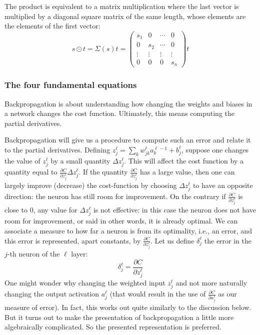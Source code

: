 \documentclass[12pt, letterpaper]{article}
\theoremstyle{definition}
\begin{document}
The product is equivalent to a matrix multiplication where the last vector is multiplied by a diagonal square matrix of the same length, whose elements are the elements of the first vector:
\begin{equation}
s\odot t = \Sigma(s) t = \begin{pmatrix} s_1 &0 &\cdots & 0 \\0 & s_2 & \cdots &0 \\
\vdots & \vdots &\vdots & \vdots\\
0  & 0 &0 &s_n
\end{pmatrix}t
\end{equation}

\subsubsection{The four fundamental equations}
Backpropagation is about understanding how changing the weights and biases in a network changes the cost function. Ultimately, this means computing the partial derivatives.

Backpropagation will give us a procedure to compute such an error and relate it to the partial derivatives. Defining $z_j^\ell = \sum_k w_{jk}^\ell a_k^{\ell-1} + b_j^\ell$, suppose one changes the value of $z_j^\ell$ by a small quantity $\Delta z_j^\ell$. This will affect the cost function by a quantity equal to $\frac{\partial C}{\partial z_j^\ell}\Delta z_j^\ell$. If the quantity $\frac{\partial C}{\partial z_j^\ell}$ has a large value, then one can largely improve (decrease) the cost-function by choosing $\Delta z_j^\ell$ to have an opposite direction: the neuron has still room for improvement. On the contrary if $\frac{\partial C}{\partial z_j^\ell}$ is close to $0$, any value for $\Delta z_j^\ell$ is not effective: in this case the neuron does not have room for improvement, or said in other words, it is already optimal. We can associate a measure to how far a neuron is from its optimality, i.e., an error, and this error is represented, apart constants, by $\frac{\partial C}{\partial z_j^\ell}$. Let us define $\delta_j^\ell$ the error in the $j$-th neuron of the $\ell$ layer:
\begin{equation}
\delta_j^\ell =\frac{\partial C}{\partial z_j^\ell}
\end{equation}
One might wonder why changing the weighted input $z_j^\ell$ and not more naturally changing the output activation $a^\ell_j$ (that would result in the use of $\frac{\partial C}{\partial a^\ell_j}$ as our measure of error). In fact, this works out quite similarly to the discussion below. But it turns out to make the presentation of backpropagation a little more algebraically complicated. So the presented representation is preferred.
\end{document}
